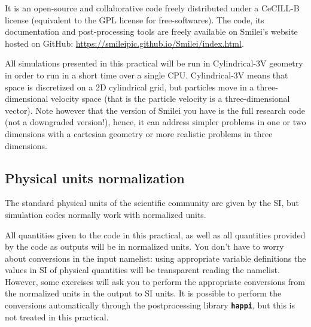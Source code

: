 \documentclass[a4paper,12pt]{extarticle}
\newcommand{\smilei}{{\sc Smilei}\xspace}
\newcommand{\commandline}[1]{\texttt{\textbf{#1}}}
\begin{document}
It is an open-source and collaborative code freely distributed under a CeCILL-B license (equivalent to the GPL license for free-softwares).
The code, its documentation and post-processing tools are freely available on \smilei's website hosted on GitHub: \url{https://smileipic.github.io/Smilei/index.html}.

All simulations presented in this practical will be run in Cylindrical-3V geometry in order to run in a short time over a single CPU.
Cylindrical-3V means that space is discretized on a 2D cylindrical grid, but particles move in a three-dimensional velocity space (that is the particle velocity is a three-dimensional vector). Note however that the version of \smilei you have is the full research code (not a downgraded version!), hence, it can address simpler problems in one or two dimensions with a cartesian geometry or more realistic problems in three dimensions.


\subsection{Physical units normalization}\label{units}
The standard physical units of the scientific community are given by the SI,  but simulation codes normally  work with normalized units. 

All quantities given to the code in this practical, as well as all quantities provided by the code as outputs will be in normalized units.
You don't have to worry about conversions in the input namelist: using appropriate variable definitions the values in SI of physical quantities will be transparent reading the namelist.
However, some exercises will ask you to perform the appropriate conversions from the normalized units in the output to SI units.  It is possible to perform the conversions automatically through the postprocessing library \commandline{happi},  but this is not treated in this practical.
\end{document}
